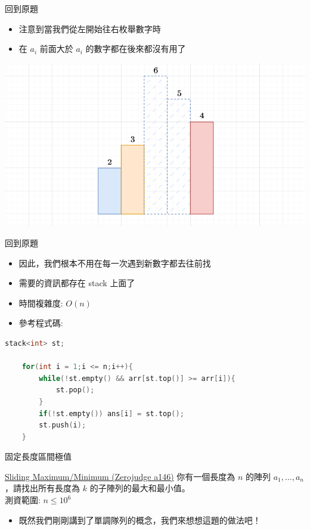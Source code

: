 \documentclass[aspectratio=169]{beamer}
\begin{document}
    \begin{frame}{回到原題}
        \begin{itemize}
            \item 注意到當我們從左開始往右枚舉數字時
            \item 在 $a_i$ 前面大於 $a_i$ 的數字都在後來都沒有用了
        \end{itemize}
        \begin{center}
            \includegraphics[scale=0.4]{images/monotonic stack.png}
        \end{center}
    \end{frame}
    
    \begin{frame}[fragile]{回到原題}
        \begin{itemize}
            \item 因此，我們根本不用在每一次遇到新數字都去往前找
            \item 需要的資訊都存在 stack 上面了
            \item 時間複雜度: $O(n)$
            \item 參考程式碼:
        \end{itemize}
        \begin{lstlisting}[language=C++,basicstyle=\ttfamily\tiny]
    stack<int> st;
 
    for(int i = 1;i <= n;i++){
        while(!st.empty() && arr[st.top()] >= arr[i]){
            st.pop();
        }
        if(!st.empty()) ans[i] = st.top();
        st.push(i);
    }
        \end{lstlisting}
    \end{frame}
    \begin{frame}{固定長度區間極值}
        \begin{block}{\href{https://zerojudge.tw/ShowProblem?problemid=a146}{Sliding Maximum/Minimum (Zerojudge a146)}}
            你有一個長度為 $n$ 的陣列 $a_1, \dots, a_n$，請找出所有長度為 $k$ 的子陣列的最大和最小值。 \\
            \vspace{5mm}
            測資範圍: $n \le 10^6$
        \end{block}
        \begin{itemize}
          \item<2-> 既然我們剛剛講到了單調隊列的概念，我們來想想這題的做法吧！
        \end{itemize}
    \end{frame}
    
\end{document}
